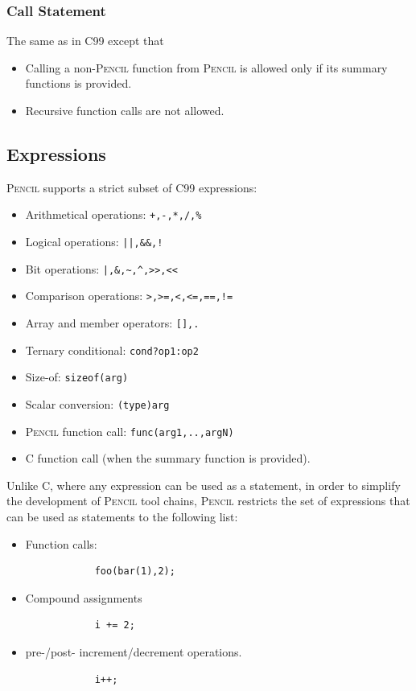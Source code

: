 \documentclass{carp}
\newcommand\pencil{\textsc{Pencil}\xspace}
\newcommand{\C}{C99\xspace}
\begin{document}
\subsubsection{Call Statement}
The same as in \C except that
\begin{itemize}
 \item Calling a non-\pencil function from \pencil
 is allowed only if its summary functions is provided.
 \item Recursive function calls are not allowed.
\end{itemize}

\subsection{Expressions}
\pencil supports a strict subset of \C expressions:
\begin{itemize}
  \item Arithmetical operations: \lstinline!+,-,*,/,%!
  \item Logical operations: \lstinline{||,&&,!}
  \item Bit operations: \lstinline{|,&,~,^,>>,<<}
  \item Comparison operations: \lstinline{>,>=,<,<=,==,!=}
  \item Array and member operators: \lstinline{[],.}
  \item Ternary conditional: \lstinline!cond?op1:op2!
  \item Size-of: \lstinline!sizeof(arg)!
  \item Scalar conversion: \lstinline!(type)arg!
  \item \pencil function call: \lstinline!func(arg1,..,argN)!
  \item C function call (when the summary function is provided).
\end{itemize}

Unlike C, where any expression can be used as a statement, in
order to simplify the development of \pencil tool chains, \pencil
restricts the set of expressions that can be used as statements
to the following list:
\begin{itemize}
    \item Function calls:
        \begin{lstlisting}
            foo(bar(1),2);
        \end{lstlisting}
    \item Compound assignments
        \begin{lstlisting}
            i += 2;
        \end{lstlisting}
    \item pre-/post- increment/decrement operations.
        \begin{lstlisting}
            i++;
        \end{lstlisting}
\end{itemize}
\end{document}
